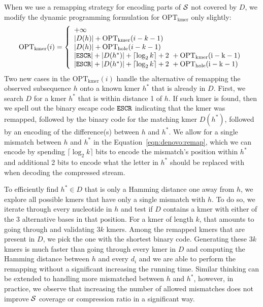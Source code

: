 \documentclass[12pt]{cmuthesis}
\begin{document}
  When we use a remapping strategy for encoding parts of $\mathcal{S}$ not covered by $D$, we modify the dynamic programming formulation for $\mathrm{OPT_{kmer}}$ only slightly:
  \begin{align}
  \mathrm{OPT_{kmer}}(i) & = \left \{
      \begin{array}{l l}
        + \infty \\
        |D(h)| + \mathrm{OPT_{kmer}}(i-k-1) \\
        |D(h)| + \mathrm{OPT_{hole}}(i-k-1) \\
        |\texttt{ESCR}| + |D(h^*)| + \lceil \log_2 k \rceil + 2~+ \mathrm{OPT_{kmer}(i-k-1)} \\
        |\texttt{ESCR}| + |D(h^*)| + \lceil \log_2 k \rceil + 2~+ \mathrm{OPT_{hole}(i-k-1)} \\
        \label{eqn:denovo:remap}
      \end{array} \right. \\
  \end{align}
  Two new cases in the $\mathrm{OPT_{kmer}}(i)$ handle the alternative of remapping the observed subsequence $h$ onto a known kmer $h^*$ that is already in $D$. First, we search $D$ for a kmer $h^*$ that is within distance 1 of $h$. If such kmer is found, then we spell out the binary escape code $\texttt{ESCR}$ indicating that the kmer was remapped, followed by the binary code for the matching kmer $D(h^*)$, followed by an encoding of the difference(s) between $h$ and $h^*$. We allow for a single mismatch between $h$ and $h^*$ in the Equation~\ref{eqn:denovo:remap}, which we can encode by spending $\lceil \log_2 k \rceil$ bits to encode the mismatch's position within $h^*$ and additional 2 bits to encode what the letter in $h^*$ should be replaced with when decoding the compressed stream.

  To efficiently find $h^* \in D$ that is only a Hamming distance one away from $h$, we explore all possible kmers that have only a single mismatch with $h$. To do so, we iterate through every nucleotide in $h$ and test if $D$ contains a kmer with either of the 3 alternative bases in that position. For a kmer of length $k$, that amounts to going through and validating $3k$ kmers. Among the remapped kmers that are present in $D$, we pick the one with the shortest binary code. Generating these $3k$ kmers is much faster than going through every kmer in $D$ and computing the Hamming distance between $h$ and every $d_i$ and we are able to perform the remapping without a significant increasing the running time. Similar thinking can be extended to handling more mismatched between $h$ and $h^*$, however, in practice, we  observe that increasing the number of allowed mismatches does not improve $\mathcal{S}$ coverage or compression ratio in a significant way.
\end{document}
